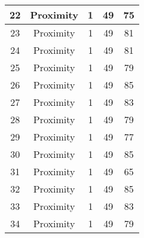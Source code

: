 \documentclass[results.tex]{subfiles}
\begin{document}
\begin{center}
\begin{tabular}{| c || c | c | c | c |}
            \hline
            22                      & Proximity                    & 1                      & 49                      & 75                   \\
            \hline
            23                      & Proximity                    & 1                      & 49                      & 81                   \\
            \hline
            24                      & Proximity                    & 1                      & 49                      & 81                   \\
            \hline
            25                      & Proximity                    & 1                      & 49                      & 79                   \\
            \hline
            26                      & Proximity                    & 1                      & 49                      & 85                   \\
            \hline
            27                      & Proximity                    & 1                      & 49                      & 83                   \\
            \hline
            28                      & Proximity                    & 1                      & 49                      & 79                   \\
            \hline
            29                      & Proximity                    & 1                      & 49                      & 77                   \\
            \hline
            30                      & Proximity                    & 1                      & 49                      & 85                   \\
            \hline
            31                      & Proximity                    & 1                      & 49                      & 65                   \\
            \hline
            32                      & Proximity                    & 1                      & 49                      & 85                   \\
            \hline
            33                      & Proximity                    & 1                      & 49                      & 83                   \\
            \hline
            34                      & Proximity                    & 1                      & 49                      & 79                   \\

\end{tabular}
\end{center}
\end{document}
